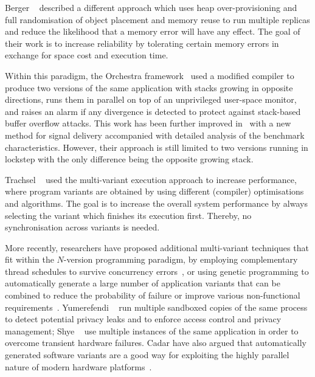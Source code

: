 Berger \etal~\cite{diehard06} described a different approach which uses heap
over-provisioning and full randomisation of object placement and memory reuse
to run multiple replicas and reduce the likelihood that a memory error will
have any effect. The goal of their work is to increase reliability by
tolerating certain memory errors in exchange for space cost and execution time.


Within this paradigm, the Orchestra framework~\cite{orchestra09} used a
modified compiler to produce two versions of the same application with stacks
growing in opposite directions, runs them in parallel on top of an unprivileged
user-space monitor, and raises an alarm if any divergence is detected to
protect against stack-based buffer overflow attacks.  This work has been
further improved in~\cite{orchestra11} with a new method for signal delivery
accompanied with detailed analysis of the benchmark characteristics. However,
their approach is still limited to two versions running in lockstep with the
only difference being the opposite growing stack.

Trachsel \etal~\cite{trachsel10} used the multi-variant execution approach to
increase performance, where program variants are obtained by using different
(compiler) optimisations and algorithms.  The goal is to increase the overall
system performance by always selecting the variant which finishes its execution
first. Thereby, no synchronisation across variants is needed.

More recently, researchers have proposed additional multi-variant techniques
that fit within the $N$-version programming paradigm, \eg by employing
complementary thread schedules to survive concurrency
errors~\cite{compl-schedules11}, or using genetic programming to automatically
generate a large number of application variants that can be combined to reduce
the probability of failure or improve various non-functional
requirements~\cite{gismoe}. Yumerefendi \etal~\cite{tightlip} run multiple
sandboxed copies of the same process to detect potential privacy leaks and to
enforce access control and privacy management; Shye \etal~\cite{shye2009} use
multiple instances of the same application in order to overcome transient
hardware failures. Cadar \etal have also argued that automatically generated
software variants are a good way for exploiting the highly parallel nature of
modern hardware platforms~\cite{multiplicity}.

